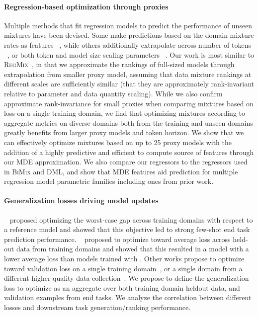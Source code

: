\paragraph{Regression-based optimization through proxies}

Multiple methods that fit regression models to predict the performance of unseen mixtures have been devised. Some make predictions based on the domain mixture rates as features ~\cite{regmix}, while others additionally extrapolate across number of tokens ~\cite{bimix}, or both token and model size scaling parameters ~\cite{dml}. Our work is most similar to \textsc{RegMix}~\cite{regmix}, in that we approximate the rankings of full-sized models through extrapolation from smaller proxy model, assuming that data mixture rankings at different scales are sufficiently similar (that they are approximately rank-invariant relative to parameter and data quantity scaling). While we also confirm approximate rank-invariance for small proxies when comparing mixtures based on loss on a single training domain, we find that optimizing mixtures according to aggregate metrics on diverse domains both from the training and unseen domains greatly benefits from larger proxy models and token horizon.  We show that we can effectively optimize mixtures based on up to 25 proxy models with the addition of a highly predictive and efficient to compute source of features through our MDE approximation. We also compare our regressors to the regressors used in \textsc{BiMix} and \textsc{DML}, and show that MDE features aid prediction for multiple regression model parametric families including ones from prior work.


\paragraph{Generalization losses driving model updates}

~\citet{doremi} proposed optimizing the worst-case gap across training domains with respect to a reference model and showed that this objective led to strong few-shot end task prediction performance. \doge~\cite{DOGE} proposed to optimize toward average loss across held-out data from training domains and showed that this resulted in a model with a lower average loss than models trained with \doremi. Other works propose to optimize toward validation loss on a single training domain~\cite{regmix}, or a single domain from a different higher-quality data collection~\cite{bimix}. We propose to define the generalization loss to optimize as an aggregate over both training domain heldout data, and validation examples from end tasks. We analyze the correlation between different losses and downstream task generation/ranking performance.

